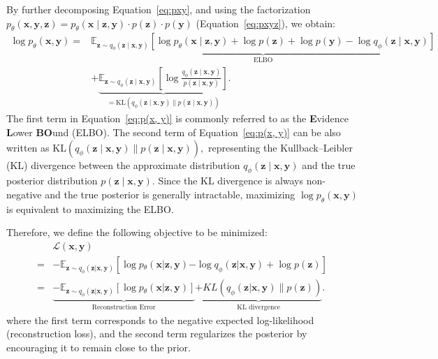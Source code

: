 \documentclass{article}
\begin{document}
{By further decomposing Equation~\eqref{eq:pxy}, and using the factorization $p_\theta(\mathbf{x}, \mathbf{y}, \mathbf{z}) = p_\theta(\mathbf{x} \mid \mathbf{z}, \mathbf{y}) \cdot p(\mathbf{z}) \cdot p(\mathbf{y})$ (Equation~\eqref{eq:pxyz}), we obtain:
\begin{equation}\label{eq:p(x, y)}
\begin{aligned}
\log p_\theta(\mathbf{x}, \mathbf{y}) 
=& \underbrace{\mathbb{E}_{\mathbf{z} \sim q_{\phi}(\mathbf{z} \mid \mathbf{x}, \mathbf{y})} \left[
\log p_\theta(\mathbf{x} \mid \mathbf{z}, \mathbf{y}) + \log p(\mathbf{z}) + \log p(\mathbf{y}) - \log q_{\phi}(\mathbf{z} \mid \mathbf{x}, \mathbf{y})
\right]}_{\text{ELBO}} \\
&+ \underbrace{\mathbb{E}_{\mathbf{z} \sim q_{\phi}(\mathbf{z} \mid \mathbf{x}, \mathbf{y})} \left[
\log \frac{q_{\phi}(\mathbf{z} \mid \mathbf{x}, \mathbf{y})}{p(\mathbf{z} \mid \mathbf{x}, \mathbf{y})}
\right]}_{=
\mathrm{KL}\left( q_\phi(\mathbf{z} \mid \mathbf{x}, \mathbf{y}) \parallel p(\mathbf{z} \mid \mathbf{x}, \mathbf{y}) \right)
}.
\end{aligned}
\end{equation}
The first term in Equation~\eqref{eq:p(x, y)} is commonly referred to as the \textbf{E}vidence \textbf{L}ower \textbf{BO}und (ELBO). The second term of Equation~\eqref{eq:p(x, y)} can be also written as 
$
\mathrm{KL}\left( q_\phi(\mathbf{z} \mid \mathbf{x}, \mathbf{y}) \parallel p(\mathbf{z} \mid \mathbf{x}, \mathbf{y}) \right),
$
representing the Kullback--Leibler (KL) divergence between the approximate distribution \( q_\phi(\mathbf{z} \mid \mathbf{x}, \mathbf{y}) \) and the true posterior distribution \( p(\mathbf{z} \mid \mathbf{x}, \mathbf{y}) \). Since the KL divergence is always non-negative and the true posterior is generally intractable, maximizing $\log p_\theta(\mathbf{x}, \mathbf{y})$ is equivalent to maximizing the ELBO.

Therefore, we define the following objective to be minimized:
\begin{equation}\label{eq:ELBO}
    \begin{aligned}
        &\mathcal{L}(\mathbf{x}, \mathbf{y}) \\
        =& - \mathbb{E}_{\mathbf{z} \sim q_\phi(\mathbf{z} | \mathbf{x}, \mathbf{y})}\left[\log p{_\theta}(\mathbf{x} | \mathbf{z}, \mathbf{y}) {- \log q_\phi(\mathbf{z} | \mathbf{x}, \mathbf{y}) + \log p(\mathbf{z})} \right] \\
        =& \underbrace{- \mathbb{E}_{\mathbf{z} \sim q_\phi(\mathbf{z} | \mathbf{x}, \mathbf{y})}\left[\log p{_\theta}(\mathbf{x} | \mathbf{z}, \mathbf{y})\right] }_{\text{Reconstruction Error}}
        \underbrace{{+ KL\left(q_\phi(\mathbf{z} | \mathbf{x}, \mathbf{y}) \parallel p(\mathbf{z})\right)}}_{\text{KL divergence}}.
    \end{aligned}
\end{equation}
where the first term corresponds to the negative expected log-likelihood (reconstruction loss), and the second term regularizes the posterior by encouraging it to remain close to the prior.

}
\end{document}
